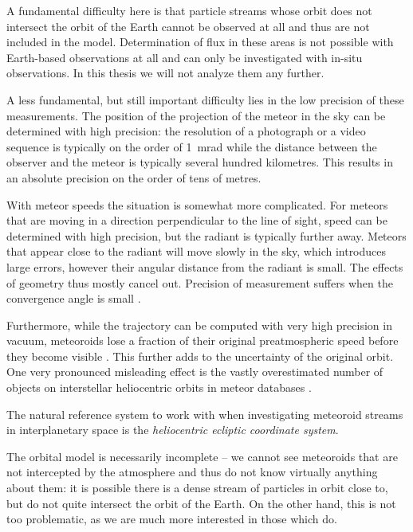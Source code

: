     A fundamental difficulty here is that particle streams whose orbit does not intersect
    the orbit of the Earth cannot be observed at all and thus are not included in the model.
    Determination of flux in these areas is not possible with Earth-based observations at all
    and can only be investigated with in-situ observations. In this thesis we will not analyze them any further.

    A less fundamental, but still important difficulty lies in the low precision of these measurements.
    The position of the projection of the meteor in the sky can be determined with high precision:
    the resolution of a photograph or a video sequence is typically on the order of \SI{1}{\milli\radian}
    while the distance between the observer and the meteor is typically several hundred kilometres.
    This results in an absolute precision on the order of tens of metres.

    With meteor speeds the situation is somewhat more complicated.
    For meteors that are moving in a direction perpendicular to the line of sight, speed can be determined
    with high precision, but the radiant is typically further away.
    Meteors that appear close to the radiant will move slowly in the sky, which introduces large errors,
    however their angular distance from the radiant is small. The effects of geometry thus mostly cancel out.
    Precision of measurement suffers when the convergence angle is small \citep{ceplecha1987}.

    Furthermore, while the trajectory can be computed with very high precision in vacuum,
    meteoroids lose a fraction of their original preatmospheric speed before they become visible \citep{vida+2018}.
    This further adds to the uncertainty of the original orbit.
    One very pronounced misleading effect is the vastly overestimated number of objects
    on interstellar heliocentric orbits in meteor databases \citep{hajdukovajr1994}.

    The natural reference system to work with when investigating meteoroid streams in interplanetary space
    is the \emph{heliocentric ecliptic coordinate system}.

    The orbital model is necessarily incomplete -- we cannot see meteoroids that are not intercepted by the atmosphere
    and thus do not know virtually anything about them: it is possible there is a dense stream of
    particles in orbit close to, but do not quite intersect the orbit of the Earth.
    On the other hand, this is not too problematic, as we are much more interested in those which do.

